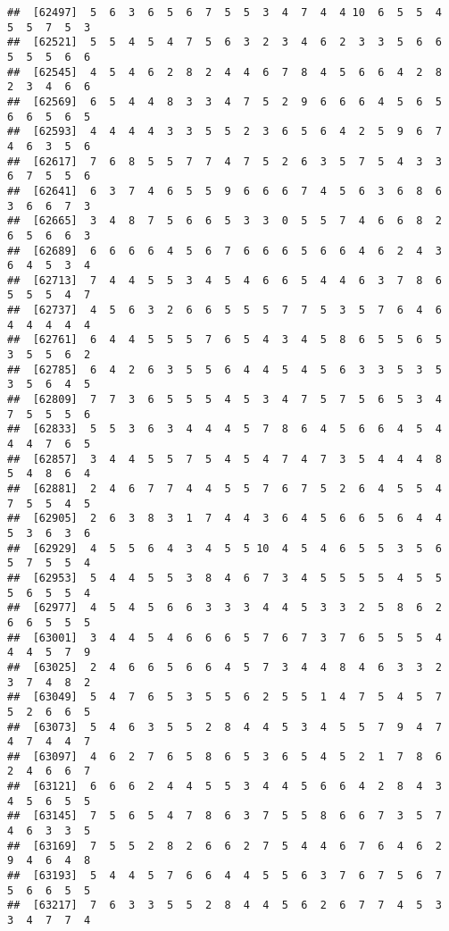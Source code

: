 \documentclass[
]{book}
\begin{document}
\begin{verbatim}
##  [62497]  5  6  3  6  5  6  7  5  5  3  4  7  4  4 10  6  5  5  4  5  5  7  5  3
##  [62521]  5  5  4  5  4  7  5  6  3  2  3  4  6  2  3  3  5  6  6  5  5  5  6  6
##  [62545]  4  5  4  6  2  8  2  4  4  6  7  8  4  5  6  6  4  2  8  2  3  4  6  6
##  [62569]  6  5  4  4  8  3  3  4  7  5  2  9  6  6  6  4  5  6  5  6  6  5  6  5
##  [62593]  4  4  4  4  3  3  5  5  2  3  6  5  6  4  2  5  9  6  7  4  6  3  5  6
##  [62617]  7  6  8  5  5  7  7  4  7  5  2  6  3  5  7  5  4  3  3  6  7  5  5  6
##  [62641]  6  3  7  4  6  5  5  9  6  6  6  7  4  5  6  3  6  8  6  3  6  6  7  3
##  [62665]  3  4  8  7  5  6  6  5  3  3  0  5  5  7  4  6  6  8  2  6  5  6  6  3
##  [62689]  6  6  6  6  4  5  6  7  6  6  6  5  6  6  4  6  2  4  3  6  4  5  3  4
##  [62713]  7  4  4  5  5  3  4  5  4  6  6  5  4  4  6  3  7  8  6  5  5  5  4  7
##  [62737]  4  5  6  3  2  6  6  5  5  5  7  7  5  3  5  7  6  4  6  4  4  4  4  4
##  [62761]  6  4  4  5  5  5  7  6  5  4  3  4  5  8  6  5  5  6  5  3  5  5  6  2
##  [62785]  6  4  2  6  3  5  5  6  4  4  5  4  5  6  3  3  5  3  5  3  5  6  4  5
##  [62809]  7  7  3  6  5  5  5  4  5  3  4  7  5  7  5  6  5  3  4  7  5  5  5  6
##  [62833]  5  5  3  6  3  4  4  4  5  7  8  6  4  5  6  6  4  5  4  4  4  7  6  5
##  [62857]  3  4  4  5  5  7  5  4  5  4  7  4  7  3  5  4  4  4  8  5  4  8  6  4
##  [62881]  2  4  6  7  7  4  4  5  5  7  6  7  5  2  6  4  5  5  4  7  5  5  4  5
##  [62905]  2  6  3  8  3  1  7  4  4  3  6  4  5  6  6  5  6  4  4  5  3  6  3  6
##  [62929]  4  5  5  6  4  3  4  5  5 10  4  5  4  6  5  5  3  5  6  5  7  5  5  4
##  [62953]  5  4  4  5  5  3  8  4  6  7  3  4  5  5  5  5  4  5  5  5  6  5  5  4
##  [62977]  4  5  4  5  6  6  3  3  3  4  4  5  3  3  2  5  8  6  2  6  6  5  5  5
##  [63001]  3  4  4  5  4  6  6  6  5  7  6  7  3  7  6  5  5  5  4  4  4  5  7  9
##  [63025]  2  4  6  6  5  6  6  4  5  7  3  4  4  8  4  6  3  3  2  3  7  4  8  2
##  [63049]  5  4  7  6  5  3  5  5  6  2  5  5  1  4  7  5  4  5  7  5  2  6  6  5
##  [63073]  5  4  6  3  5  5  2  8  4  4  5  3  4  5  5  7  9  4  7  4  7  4  4  7
##  [63097]  4  6  2  7  6  5  8  6  5  3  6  5  4  5  2  1  7  8  6  2  4  6  6  7
##  [63121]  6  6  6  2  4  4  5  5  3  4  4  5  6  6  4  2  8  4  3  4  5  6  5  5
##  [63145]  7  5  6  5  4  7  8  6  3  7  5  5  8  6  6  7  3  5  7  4  6  3  3  5
##  [63169]  7  5  5  2  8  2  6  6  2  7  5  4  4  6  7  6  4  6  2  9  4  6  4  8
##  [63193]  5  4  4  5  7  6  6  4  4  5  5  6  3  7  6  7  5  6  7  5  6  6  5  5
##  [63217]  7  6  3  3  5  5  2  8  4  4  5  6  2  6  7  7  4  5  3  3  4  7  7  4

\end{verbatim}
\end{document}
